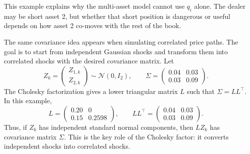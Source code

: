This example explains why the multi-asset model cannot use $q_i$ alone. The dealer may be short asset 2, but whether that short position is dangerous or useful depends on how asset 2 co-moves with the rest of the book.

The same covariance idea appears when simulating correlated price paths. The goal is to start from independent Gaussian shocks and transform them into correlated shocks with the desired covariance matrix. Let
\[
Z_k=
\begin{pmatrix}
Z_{1,k}\\
Z_{2,k}
\end{pmatrix}
\sim
\mathcal{N}(0,I_2),
\qquad
\Sigma=
\begin{pmatrix}
0.04 & 0.03\\
0.03 & 0.09
\end{pmatrix}.
\]
The Cholesky factorization gives a lower triangular matrix $L$ such that $\Sigma=LL^\top$. In this example,
\[
L=
\begin{pmatrix}
0.20 & 0\\
0.15 & 0.2598
\end{pmatrix},
\qquad
LL^\top=
\begin{pmatrix}
0.04 & 0.03\\
0.03 & 0.09
\end{pmatrix}.
\]
Thus, if $Z_k$ has independent standard normal components, then $LZ_k$ has covariance matrix $\Sigma$. This is the key role of the Cholesky factor: it converts independent shocks into correlated shocks.

